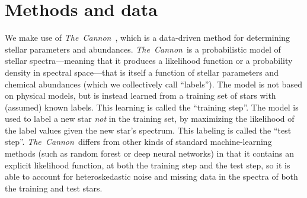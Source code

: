 \documentclass[12pt, preprint]{aastex}
\newcommand{\project}[1]{\textsl{#1}}
\newcommand{\tc}{\project{The~Cannon}}
\begin{document}




\section{Methods and data}

We make use of \tc\ \citep{Ness2015}, which is a data-driven method for
determining stellar parameters and abundances.
\tc\ is a probabilistic model of stellar spectra---meaning that it
produces a likelihood function or a probability density in spectral
space---that is itself a function of stellar parameters and chemical
abundances (which we collectively call ``labels'').
The model is not based on physical models, but is instead learned
from a training set of stars with (assumed) known labels.
This learning is called the ``training step''.
The model is used to label a new star \emph{not} in the training set,
by maximizing the likelihood of the label values given the new star's
spectrum.
This labeling is called the ``test step''.
\tc\ differs from other kinds of standard machine-learning methods
(such as random forest or deep neural networks) in that it contains an
explicit likelihood function, at both the training step and the test
step, so it is able to account for heteroskedastic noise and missing
data in the spectra of both the training and test stars.
\end{document}
